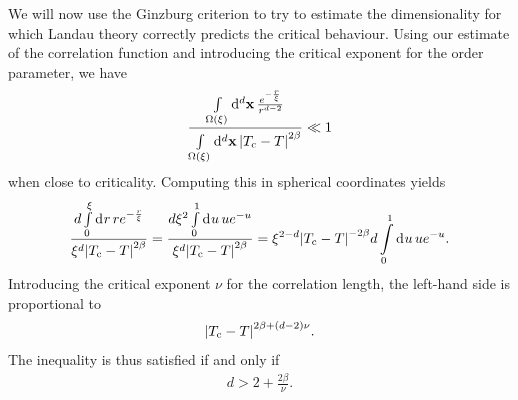 We will now use the Ginzburg criterion to try to estimate the dimensionality for which Landau theory correctly predicts the critical behaviour. Using our estimate of the correlation function and introducing the critical exponent for the order parameter, we have
\begin{align*}
	\frac{\integ[d]{\Omega(\xi)}{}{\vb{x}}{\frac{e^{-\frac{r}{\xi}}}{r^{d - 2}}}}{\integ[d]{\Omega(\xi)}{}{\vb{x}}{\abs{T_{\text{c}} - T}^{2\beta}}} \ll 1
\end{align*}
when close to criticality. Computing this in spherical coordinates yields
\begin{align*}
	\frac{d\integ{0}{\xi}{r}{re^{-\frac{r}{\xi}}}}{\xi^{d}\abs{T_{\text{c}} - T}^{2\beta}} = \frac{d\xi^{2}\integ{0}{1}{u}{ue^{-u}}}{\xi^{d}\abs{T_{\text{c}} - T}^{2\beta}} = \xi^{2 - d}\abs{T_{\text{c}} - T}^{-2\beta}d\integ{0}{1}{u}{ue^{-u}}.
\end{align*}
Introducing the critical exponent $\nu$ for the correlation length, the left-hand side is proportional to
\begin{align*}
	\abs{T_{\text{c}} - T}^{2\beta + (d - 2)\nu}.
\end{align*}
The inequality is thus satisfied if and only if
\begin{align*}
	d > 2 + \frac{2\beta}{\nu}.
\end{align*}